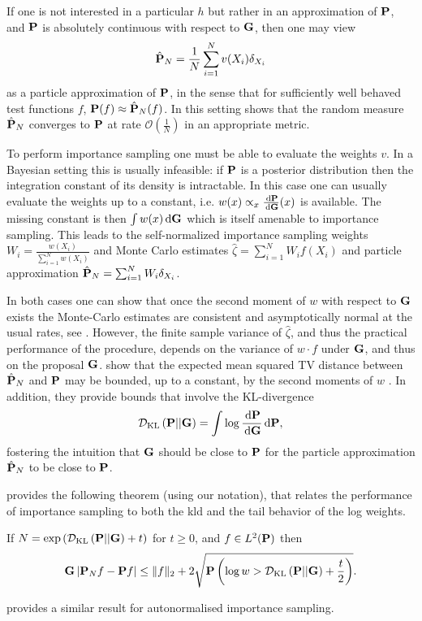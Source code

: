 If one is not interested in a particular $h$ but rather in an approximation of $\P$, and $\P$ is absolutely continuous with respect to $\G$, then one may view 
\begin{align}
\label{eq:is-particle-approximation}
\hat \P_N = \frac{1}{N} \sum_{i = 1}^{N} v(X_i) \delta_{X_i}
\end{align}
as a particle approximation of $\P$, in the sense that for sufficiently well behaved test functions $f$, $\P (f) \approx \hat\P_{N}(f)$. In this setting \cite{Agapiou2017Importance} shows that the random measure $\hat \P_N$ converges to $\P$ at rate $\mathcal O\left(\frac 1 N\right)$ in an appropriate metric. 

To perform importance sampling one must be able to evaluate the weights $v$. In a Bayesian setting this is usually infeasible: if $\P$ is a posterior distribution then the integration constant of its density is intractable.
In this case one can usually evaluate the weights up to a constant, i.e. $w(x) \propto_x \frac{\d \P}{\d \G}(x)$ is available. The missing constant is then $\int w(x) \d \G$ which is itself amenable to importance sampling.
This leads to the self-normalized importance sampling weights $W_i = \frac{w(X_i)}{\sum_{i = 1}^N w(X_i)}$ and Monte Carlo estimates $\hat \zeta = \sum_{i = 1}^{N} W_i f(X_i)$ and particle approximation $\hat \P_N = \sum_{i = 1}^{N} W_i \delta_{X_i}$.

In both cases one can show that once the second moment of $w$ with respect to $\G$ exists the Monte-Carlo estimates are consistent and asymptotically normal at the usual rates, see \cite[Chapter 8]{Chopin2020Introduction}. 
However, the finite sample variance of $\hat\zeta$, and thus the practical performance of the procedure, depends on the variance of $w\cdot f$ under $\G$, and thus on the proposal $\G$. \cite{Agapiou2017Importance} show that  the expected mean squared TV distance  between $\hat \P_N$ and  $\P$ may be bounded, up to a constant, by the second moments of $w$ . In addition, they provide bounds that involve the KL-divergence 
$$
\Dkl{\P}{\G} = \int \log \frac{\d \P}{\d \G} \d \P,
$$
fostering the intuition that $\G$ should be close to $\P$ for the particle approximation $\hat\P_{N}$ to be close to $\P$.

\cite{Chatterjee2018Sample} provides the following theorem (using our notation), that relates the performance of importance sampling to both the \gls{kld} and the tail behavior of the log weights.
\begin{theorem}
    \label{thm:chatterje2018Thm1}
    If $N = \exp \left( \Dkl{\P}{\G} + t \right)$ for $ t\geq 0$, and $f \in L^{2}(\P)$ then
    $$
        \G \left\lvert \P_{N} f - \P f \right\rvert \leq \lVert f \rVert_{2} + 2 \sqrt{ \P \left( \log w > \Dkl{\P}{\G} + \frac{t}{2} \right)}.
    $$
\end{theorem}
\citep[Theorem 1.2]{Chatterjee2018Sample} provides a similar result for autonormalised importance sampling.

